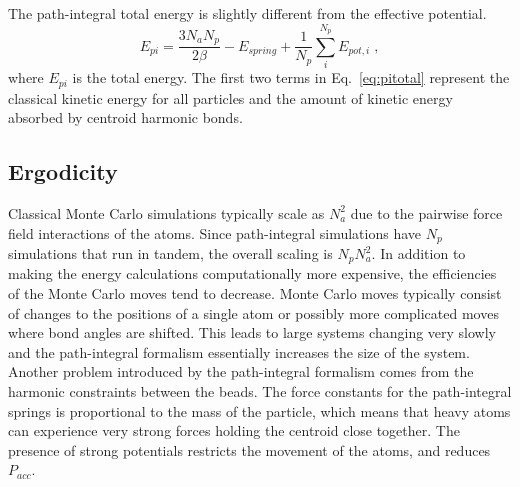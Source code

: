 \documentclass[12pt]{report}
\begin{document}
The path-integral total energy is slightly different from the effective
potential.
\begin{equation}
 \label{eq:pitotal}
 E_{pi} = \frac{3N_aN_p}{2\beta}-E_{spring}
          +\frac{1}{N_p}\sum_i^{N_p} E_{pot,i} \; ,
\end{equation}
where $E_{pi}$ is the total energy. The first two terms in Eq.\
\ref{eq:pitotal} represent the classical kinetic energy for all particles and
the amount of kinetic energy absorbed by centroid harmonic bonds.

\subsection{Ergodicity}

Classical Monte Carlo simulations typically scale as $N_a^2$ due to the
pairwise force field interactions of the atoms. Since path-integral
simulations have $N_p$ simulations that run in tandem, the overall scaling is
$N_pN_a^2$. In addition to making the energy calculations computationally more
expensive, the efficiencies of the Monte Carlo moves tend to decrease. Monte
Carlo moves typically consist of changes to the positions of a single atom or
possibly more complicated moves where bond angles are shifted. This leads to
large systems changing very slowly and the path-integral formalism essentially
increases the size of the system. \\

Another problem introduced by the path-integral formalism comes from the
harmonic constraints between the beads. The force constants for the
path-integral springs is proportional to the mass of the particle, which means
that heavy atoms can experience very strong forces holding the centroid
close together. The presence of strong potentials restricts the movement of
the atoms, and reduces $P_{acc}$.

\FloatBarrier


\end{document}
